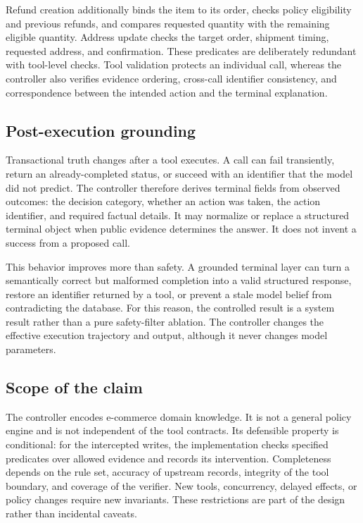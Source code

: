 \documentclass[11pt]{article}
\begin{document}
Refund creation additionally binds the item to its order, checks policy eligibility and previous refunds, and compares requested quantity with the remaining eligible quantity. Address update checks the target order, shipment timing, requested address, and confirmation. These predicates are deliberately redundant with tool-level checks. Tool validation protects an individual call, whereas the controller also verifies evidence ordering, cross-call identifier consistency, and correspondence between the intended action and the terminal explanation.

\subsection{Post-execution grounding}

Transactional truth changes after a tool executes. A call can fail transiently, return an already-completed status, or succeed with an identifier that the model did not predict. The controller therefore derives terminal fields from observed outcomes: the decision category, whether an action was taken, the action identifier, and required factual details. It may normalize or replace a structured terminal object when public evidence determines the answer. It does not invent a success from a proposed call.

This behavior improves more than safety. A grounded terminal layer can turn a semantically correct but malformed completion into a valid structured response, restore an identifier returned by a tool, or prevent a stale model belief from contradicting the database. For this reason, the controlled result is a system result rather than a pure safety-filter ablation. The controller changes the effective execution trajectory and output, although it never changes model parameters.

\subsection{Scope of the claim}

The controller encodes e-commerce domain knowledge. It is not a general policy engine and is not independent of the tool contracts. Its defensible property is conditional: for the intercepted writes, the implementation checks specified predicates over allowed evidence and records its intervention. Completeness depends on the rule set, accuracy of upstream records, integrity of the tool boundary, and coverage of the verifier. New tools, concurrency, delayed effects, or policy changes require new invariants. These restrictions are part of the design rather than incidental caveats.
\end{document}
